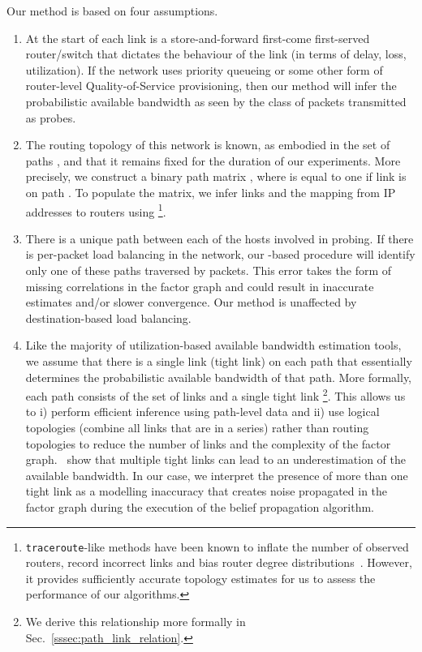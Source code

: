 \documentclass[final,5p,times,twocolumn]{elsarticle}
\begin{document}
Our method is based on four assumptions.  
\begin{enumerate}
\item At the start of each link is a store-and-forward first-come first-served router/switch that dictates the behaviour of the link (in terms of delay, loss, utilization).  If the network uses priority queueing or some other form of router-level Quality-of-Service provisioning, then our method will infer the probabilistic available bandwidth as seen by the class of packets transmitted as probes.
\item The routing topology of this network is known, as embodied in the set of paths , and that it remains fixed for the duration of our experiments.  
More precisely, we construct a  binary path matrix , where  is equal to one if link  is on path .  
To populate the matrix, we infer links and the mapping from IP addresses to routers using \footnote{\texttt{traceroute}-like methods have been known to inflate the number of observed routers, record incorrect links and bias router degree distributions~\cite{she:08}.  However, it provides sufficiently accurate topology estimates for us to assess the performance of our algorithms.}.  
\item There is a unique path between each of the hosts involved in probing.  If there is per-packet load balancing in the network, our -based procedure will identify only one of these paths traversed by packets.  This error takes the form of missing correlations in the factor graph and could result in inaccurate estimates and/or slower convergence.  Our method is unaffected by destination-based load balancing.
\item Like the majority of utilization-based available bandwidth estimation tools, we assume that there is a single link (tight link) on each path that essentially determines the probabilistic available bandwidth of that path.  More formally, each path consists of the set of links  and a single tight link \footnote{We derive this relationship more formally in Sec.~\ref{sssec:path_link_relation}.}.  This allows us to i) perform efficient inference using path-level data and ii) use logical topologies (combine all links that are in a series) rather than routing topologies to reduce the number of links and the complexity of the factor graph.~\citet{jai:03} show that multiple tight links can lead to an underestimation of the available bandwidth.  In our case, we interpret the presence of more than one tight link as a modelling inaccuracy that creates noise propagated in the factor graph during the execution of the belief propagation algorithm.
\end{enumerate}
	
\end{document}
